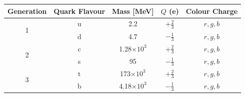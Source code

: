\documentclass[12pt,a4paper,epsf,portrait,times,epsfig]{report}
\begin{document}
	\begin{table} [h!]
		\begin{center}
			\begin{tabular}{ c|c|c|c|c }
				\hline \hline
				Generation & Quark Flavour & Mass [MeV] & $Q$ (e) & Colour Charge \rule{0pt}{2.6ex}\rule[-0.9ex]{0pt}{0pt}\\ 
				\hline \hline
				\multirow{2}{*}{1} & u & 2.2 & $+\frac{2}{3}$ & $r,g,b$ \rule{0pt}{2.6ex}\rule[-0.9ex]{0pt}{0pt}\\ 
								   & d & 4.7 & $-\frac{1}{3}$ & $r,g,b$ \rule{0pt}{2.6ex}\rule[-1.6ex]{0pt}{0pt}\\ 
				\hline
				\multirow{2}{*}{2} & c & 1.28$\times 10^{3}$ & $+\frac{2}{3}$ & $r,g,b$ \rule{0pt}{2.6ex}\rule[-0.9ex]{0pt}{0pt}\\ 
								   & s & 95 & $-\frac{1}{3}$ & $r,g,b$ \rule{0pt}{2.6ex}\rule[-1.6ex]{0pt}{0pt}\\
				\hline
				\multirow{2}{*}{3} & t & 173$\times 10^{3}$ & $+\frac{2}{3}$ & $r,g,b$ \rule{0pt}{2.6ex}\rule[-0.9ex]{0pt}{0pt}\\
				                   & b & 4.18$\times 10^{3}$ & $-\frac{1}{3}$ & $r,g,b$ \rule{0pt}{2.6ex}\rule[-1.6ex]{0pt}{0pt}\\
				\hline \hline


\end{tabular}
\end{center}
\end{table}
\end{document}
